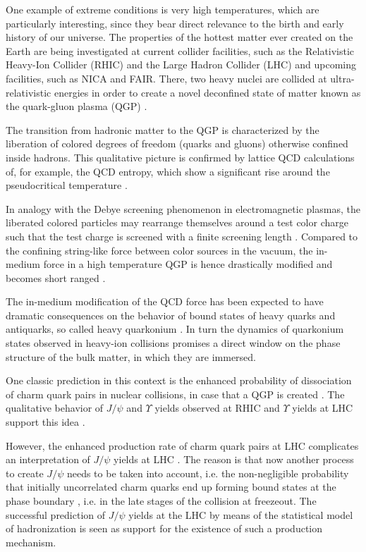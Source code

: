\documentclass[prd,11pt, amsmath, amsymb, aps, reprint, tightenlines, nofootinbib, longbibliography, abbrv, preprintnumbers]{revtex4-1}
\begin{document}
One example of extreme conditions is very high temperatures, which are particularly interesting, since they bear direct relevance to the birth and early history of our universe.
The properties of the hottest matter ever created on the Earth are being investigated at current collider facilities, such as the Relativistic Heavy-Ion Collider (RHIC) and the Large Hadron Collider (LHC) and upcoming facilities, such as NICA and FAIR. There, two heavy nuclei are collided at ultra-relativistic energies in order to create a novel deconfined state of matter known as the quark-gluon plasma (QGP) \cite{Jacak:2012dx}.

The transition from hadronic matter to the QGP is characterized by the liberation of colored degrees of freedom (quarks and gluons) otherwise confined inside hadrons.
This qualitative picture is confirmed by lattice QCD calculations of, for example, the QCD entropy, which show a significant rise around the pseudocritical temperature \cite{Borsanyi:2013bia, Bazavov:2014pvz,Borsanyi:2016ksw,Bazavov:2017dsy}. 

In analogy with the Debye screening phenomenon in electromagnetic plasmas, the liberated colored particles may rearrange themselves around a test color charge such that the test charge is screened with a finite screening length \cite{McLerran:1981pb}.
Compared to the confining string-like force between color sources in the vacuum, the in-medium force in a high temperature QGP is hence drastically modified and becomes short ranged \cite{Kaczmarek:2005ui,Maezawa:2007fc,Bazavov:2016uvm}.

The in-medium modification of the QCD force has been expected to have dramatic consequences on the behavior of bound states of heavy quarks and antiquarks, so called heavy quarkonium \cite{Brambilla:2010cs,Andronic:2015wma}.
In turn the dynamics of quarkonium states observed in heavy-ion collisions promises a direct window on the phase structure of the bulk matter, in which they are immersed.

One classic prediction in this context is the enhanced probability of dissociation of charm quark pairs in nuclear collisions, in case that a QGP is created \cite{Matsui:1986dk}.
The qualitative behavior of $J/\psi$ and $\Upsilon$ yields observed at RHIC and $\Upsilon$ yields at LHC support this idea \cite{Adamczyk:2013poh, Adare:2014hje, Adare:2006ns, Adare:2008sh, Adare:2011yf, Adamczyk:2013tvk, Chatrchyan:2011pe, Chatrchyan:2012lxa, Khachatryan:2016xxp, Abelev:2014nua}.

However, the enhanced production rate of charm quark pairs at LHC complicates an interpretation of $J/\psi$ yields at LHC \cite{Abelev:2013ila, Adam:2016rdg}.
The reason is that now another process to create $J/\psi$ needs to be taken into account, i.e. the  non-negligible probability that initially uncorrelated charm quarks end up forming bound states at the phase boundary \cite{BraunMunzinger:2000px}, i.e. in the late stages of the collision at freezeout.
The successful prediction of $J/\psi$ yields at the LHC by means of the statistical model of hadronization \cite{Andronic:2010dt} is seen as support for the existence of such a production mechanism.
 
\end{document}
